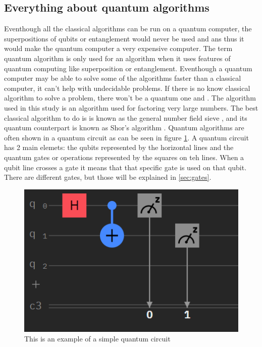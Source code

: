 \subsection{Everything about quantum algorithms}
Eventhough all the classical algorithms can be run on a quantum computer, the superpositions of qubits or entanglement would never be used \autocite{qalgo} and \autocite{quantumalgo} ans thus it would make the quantum computer a very expensive computer.
The term quantum algorithm is only used for an algorithm when it uses features of quantum computing like superposition or entanglement.
Eventhough a quantum computer may be able to solve some of the algorithms faster than a classical computer, it can't help with undecidable problems. If there is no know classical algorithm to solve a problem, there won't be a quantum one \autocite{undecidable} and \autocite{quantumalgo}.
The algorithm used in this study is an algorithm used for factoring very large numbers. The best classical algorithm to do is is known as the general number field sieve \autocite{GNFS}, and its quantum counterpart is known as Shor's algorithm \autocite{Shor}.
Quantum algorithms are often shown in a quantum circuit as can be seen in figure \ref{fig:Quantum circuit}. A quantum circuit has 2 main elemets: the qubits represented by the horizontal lines and the quantum gates or operations represented by the squares on teh lines.
When a qubit line crosses a gate it means that that specific gate is used on that qubit. There are different gates, but those will be explained in \ref{sec:gates}.

\begin{figure} [h]
    \centering
    \includegraphics[width=\textwidth]{img/circuitVB.PNG}
        \caption{This is an example of a simple quantum circuit}
        \label{fig:Quantum circuit}
\end{figure}

